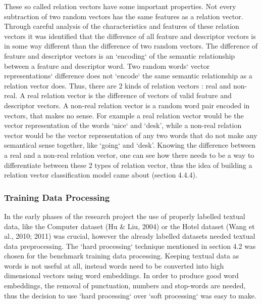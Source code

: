 \documentclass{sig-alternate}
\begin{document}
These so called relation vectors have some important properties. Not every subtraction of two random vectors has the same features as a relation vector. Through careful analysis of the characteristics and features of these relation vectors it was identified that the difference of all feature and descriptor vectors is in some way different than the difference of two random vectors. The difference of feature and descriptor vectors is an `encoding` of the semantic relationship between a feature and descriptor word. Two random words` vector  representations` difference does not `encode` the same semantic relationship as a relation vector does. Thus, there are 2 kinds of relation vectors : real and non-real. A real relation vector is the difference of vectors of valid feature and descriptor vectors. A non-real relation vector is a random word pair encoded in vectors, that makes no sense. For example a real relation vector would be the vector representation of the words `nice` and `desk', while a non-real relation vector would be the vector representation of any two words that do not make any semantical sense together, like `going` and `desk'. Knowing the difference between a real and a non-real relation vector, one can see how there needs to be a way to differentiate between these 2 types of relation vector, thus the idea of building a relation vector classification model came about (section 4.4.4).

\subsubsection{Training Data Processing}
In the early phases of the research project the use of properly labelled textual data, like the Computer dataset (Hu \& Liu, 2004) or the Hotel dataset (Wang et al., 2010; 2011) was crucial, however the already labelled datasets needed textual data preprocessing. The `hard processing` technique mentioned in section 4.2 was chosen for the benchmark training data processing. Keeping textual data as words is not useful at all, instead words need to be converted into high dimensional vectors using word embeddings. In order to produce good word embeddings, the removal of punctuation, numbers and stop-words are needed, thus the decision to use `hard processing` over `soft processing` was easy to make.
\end{document}
